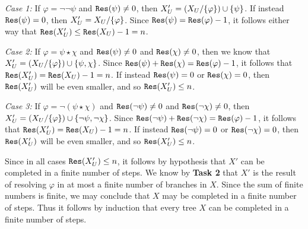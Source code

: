 \documentclass[a4paper, 11pt]{article} %
\begin{document}
\textit{Case 1:} 
If $\varphi=\neg\neg\psi$ and $\texttt{Res}(\psi)\neq 0$, then $X'_U=(X_U/\lbrace\varphi\rbrace)\cup\lbrace\psi\rbrace$.
If instead $\texttt{Res}(\psi)=0$, then $X'_U=X_U/\lbrace\varphi\rbrace$.
Since $\texttt{Res}(\psi)=\texttt{Res}(\varphi)-1$, it follows either way that $\texttt{Res}(X'_U) \leq \texttt{Res}(X_U)-1=n$.

\textit{Case 2:} 
If $\varphi=\psi\star\chi$ and $\texttt{Res}(\psi)\neq 0$ and $\texttt{Res}(\chi)\neq 0$, then we know that $X'_U=(X_U/\lbrace\varphi\rbrace)\cup\lbrace\psi,\chi\rbrace$.
Since $\texttt{Res}(\psi)+\texttt{Res}(\chi)=\texttt{Res}(\varphi)-1$, it follows that $\texttt{Res}(X'_U)=\texttt{Res}(X_U)-1=n$.
If instead $\texttt{Res}(\psi)=0$ or $\texttt{Res}(\chi)=0$, then $\texttt{Res}(X'_U)$ will be even smaller, and so $\texttt{Res}(X'_U)\leq n$.

\textit{Case 3:} 
If $\varphi=\neg(\psi\star\chi)$ and $\texttt{Res}(\neg\psi)\neq 0$ and $\texttt{Res}(\neg\chi)\neq 0$, then $X'_U=(X_U/\lbrace\varphi\rbrace)\cup\lbrace\neg\psi,\neg\chi\rbrace$.
Since $\texttt{Res}(\neg\psi)+\texttt{Res}(\neg\chi)=\texttt{Res}(\varphi)-1$, it follows that $\texttt{Res}(X'_U)=\texttt{Res}(X_U)-1=n$.
If instead $\texttt{Res}(\neg\psi)=0$ or $\texttt{Res}(\neg\chi)=0$, then $\texttt{Res}(X'_U)$ will be even smaller, and so $\texttt{Res}(X'_U)\leq n$.

Since in all cases $\texttt{Res}(X'_U)\leq n$, it follows by hypothesis that $X'$ can be completed in a finite number of steps.
We know by \textbf{Task 2} that $X'$ is the result of resolving $\varphi$ in at most a finite number of branches in $X$.
Since the sum of finite numbers is finite, we may conclude that $X$ may be completed in a finite number of steps. 
Thus it follows by induction that every tree $X$ can be completed in a finite number of steps. 













\end{document}

